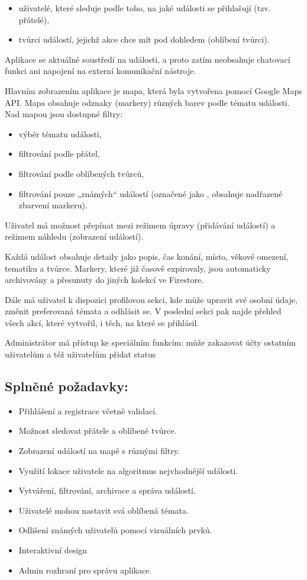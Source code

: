 \begin{itemize}
\item uživatelé, které sleduje podle toho, na jaké události se přihlašují (tzv. přátelé),
\item tvůrci událostí, jejichž akce chce mít pod dohledem (oblíbení tvůrci).
\end{itemize}

Aplikace se aktuálně soustředí na události, a proto zatím neobsahuje chatovací funkci ani napojení na externí komunikační nástroje.

Hlavním zobrazením aplikace je mapa, která byla vytvořena pomocí Google Maps API. Mapa obsahuje odznaky (markery) různých barev podle tématu události. Nad mapou jsou dostupné filtry:

\begin{itemize}
\item výběr tématu události,
\item filtrování podle přátel,
\item filtrování podle oblíbených tvůrců,
\item filtrování pouze „známých“ událostí (označené jako , obsahuje nadřazené zbarvení markeru).
\end{itemize}

Uživatel má možnost přepínat mezi režimem úpravy (přidávání událostí) a režimem náhledu (zobrazení událostí).

Každá událost obsahuje detaily jako popis, čas konání, místo, věkové omezení, tematiku a tvůrce. Markery, které již časově expirovaly, jsou automaticky archivovány a přesunuty do jiných kolekcí ve Firestore.

Dále má uživatel k dispozici profilovou sekci, kde může upravit své osobní údaje, změnit preferovaná témata a odhlásit se. V poslední sekci pak najde přehled všech akcí, které vytvořil, i těch, na které se přihlásil.

\vspace{0.5em}
Administrátor má přístup ke speciálním funkcím: může zakazovat účty ostatním uživatelům a též uživatelům přidat status 

\subsection*{Splněné požadavky:}
\begin{itemize}
\item Přihlášení a registrace včetně validací.
\item Možnost sledovat přátele a oblíbené tvůrce.
\item Zobrazení událostí na mapě s různými filtry.
\item Využití lokace uživatele na algoritmus nejvhodnější události.
\item Vytváření, filtrování, archivace a správa událostí.
\item Uživatelé mohou nastavit svá oblíbená témata.
\item Odlišení známých uživatelů pomocí vizuálních prvků.
\item Interaktivní design
\item Admin rozhraní pro správu aplikace.
\end{itemize}


